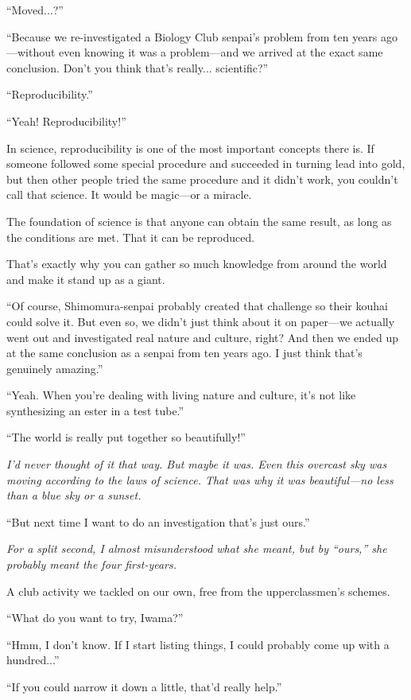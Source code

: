 \documentclass[
    a4paper,
    12pt,
    twoside,
    openany,
    UTF8,
    fontset=windows
]{ctexbook}
\begin{document}
``Moved...?''

``Because we re-investigated a Biology Club senpai's problem from ten years ago---without even knowing it was a problem---and we arrived at the exact same conclusion. Don't you think that's really... scientific?''

``Reproducibility.''

``Yeah! Reproducibility!''

In science, reproducibility is one of the most important concepts there is. If someone followed some special procedure and succeeded in turning lead into gold, but then other people tried the same procedure and it didn't work, you couldn't call that science. It would be magic---or a miracle.

The foundation of science is that anyone can obtain the same result, as long as the conditions are met. That it can be reproduced.

That's exactly why you can gather so much knowledge from around the world and make it stand up as a giant.

``Of course, Shimomura-senpai probably created that challenge so their kouhai could solve it. But even so, we didn't just think about it on paper---we actually went out and investigated real nature and culture, right? And then we ended up at the same conclusion as a senpai from ten years ago. I just think that's genuinely amazing.''

``Yeah. When you're dealing with living nature and culture, it's not like synthesizing an ester in a test tube.''

``The world is really put together so beautifully!''

\textit{I'd never thought of it that way. But maybe it was. Even this overcast sky was moving according to the laws of science. That was why it was beautiful---no less than a blue sky or a sunset.}

``But next time I want to do an investigation that's just ours.''

\textit{For a split second, I almost misunderstood what she meant, but by ``ours,'' she probably meant the four first-years.}

A club activity we tackled on our own, free from the upperclassmen's schemes.

``What do you want to try, Iwama?''

``Hmm, I don't know. If I start listing things, I could probably come up with a hundred...''

``If you could narrow it down a little, that'd really help.''
\end{document}
